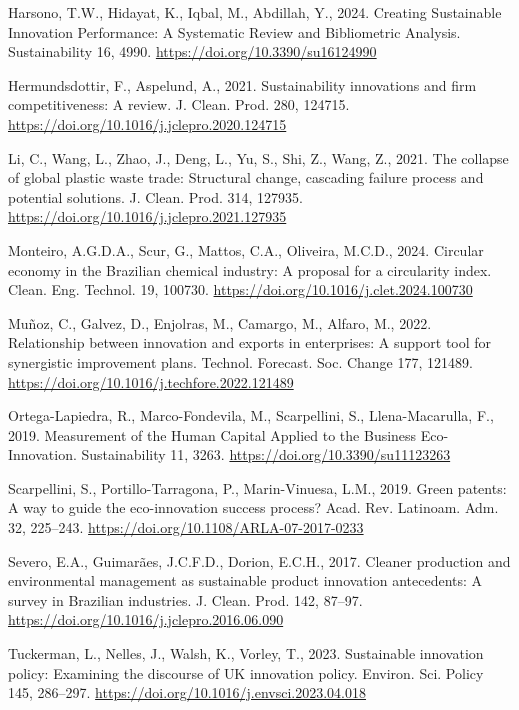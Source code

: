 \documentclass[
  12pt,
  oneside]{book}
\newlength{\cslhangindent}
\newenvironment{CSLReferences}[2] %
 {\begin{list}{}{%
  \setlength{\itemindent}{0pt}
  \setlength{\leftmargin}{0pt}
  \setlength{\parsep}{0pt}
  \ifodd #1
   \setlength{\leftmargin}{\cslhangindent}
   \setlength{\itemindent}{-1\cslhangindent}
  \fi
  \setlength{\itemsep}{#2\baselineskip}}}
 {\end{list}}
\begin{document}
\begin{CSLReferences}{1}{0}
Harsono, T.W., Hidayat, K., Iqbal, M., Abdillah, Y., 2024. Creating
{Sustainable Innovation Performance}: {A Systematic Review} and
{Bibliometric Analysis}. Sustainability 16, 4990.
\url{https://doi.org/10.3390/su16124990}

Hermundsdottir, F., Aspelund, A., 2021. Sustainability innovations and
firm competitiveness: {A} review. J. Clean. Prod. 280, 124715.
\url{https://doi.org/10.1016/j.jclepro.2020.124715}

Li, C., Wang, L., Zhao, J., Deng, L., Yu, S., Shi, Z., Wang, Z., 2021.
The collapse of global plastic waste trade: {Structural} change,
cascading failure process and potential solutions. J. Clean. Prod. 314,
127935. \url{https://doi.org/10.1016/j.jclepro.2021.127935}

Monteiro, A.G.D.A., Scur, G., Mattos, C.A., Oliveira, M.C.D., 2024.
Circular economy in the {Brazilian} chemical industry: {A} proposal for
a circularity index. Clean. Eng. Technol. 19, 100730.
\url{https://doi.org/10.1016/j.clet.2024.100730}

Muñoz, C., Galvez, D., Enjolras, M., Camargo, M., Alfaro, M., 2022.
Relationship between innovation and exports in enterprises: {A} support
tool for synergistic improvement plans. Technol. Forecast. Soc. Change
177, 121489. \url{https://doi.org/10.1016/j.techfore.2022.121489}

Ortega-Lapiedra, R., Marco-Fondevila, M., Scarpellini, S.,
Llena-Macarulla, F., 2019. Measurement of the {Human Capital Applied} to
the {Business Eco-Innovation}. Sustainability 11, 3263.
\url{https://doi.org/10.3390/su11123263}

Scarpellini, S., Portillo-Tarragona, P., Marin-Vinuesa, L.M., 2019.
Green patents: A way to guide the eco-innovation success process? Acad.
Rev. Latinoam. Adm. 32, 225--243.
\url{https://doi.org/10.1108/ARLA-07-2017-0233}

Severo, E.A., Guimarães, J.C.F.D., Dorion, E.C.H., 2017. Cleaner
production and environmental management as sustainable product
innovation antecedents: {A} survey in {Brazilian} industries. J. Clean.
Prod. 142, 87--97. \url{https://doi.org/10.1016/j.jclepro.2016.06.090}

Tuckerman, L., Nelles, J., Walsh, K., Vorley, T., 2023. Sustainable
innovation policy: {Examining} the discourse of {UK} innovation policy.
Environ. Sci. Policy 145, 286--297.
\url{https://doi.org/10.1016/j.envsci.2023.04.018}


\end{CSLReferences}
\end{document}
